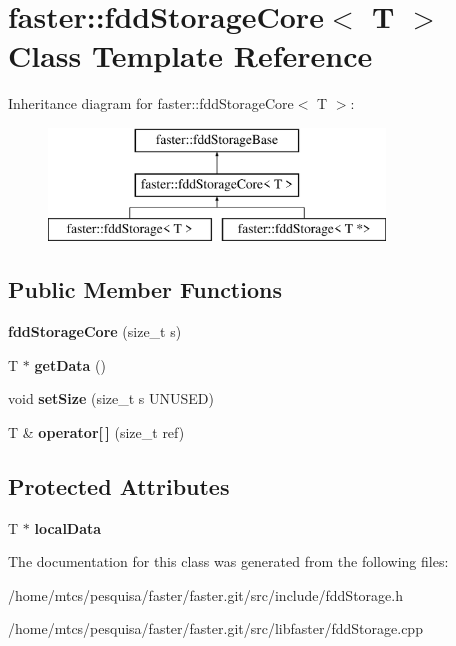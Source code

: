 \hypertarget{classfaster_1_1fddStorageCore}{}\section{faster\+:\+:fdd\+Storage\+Core$<$ T $>$ Class Template Reference}
\label{classfaster_1_1fddStorageCore}
Inheritance diagram for faster\+:\+:fdd\+Storage\+Core$<$ T $>$\+:\begin{figure}[H]
\begin{center}
\leavevmode
\includegraphics[height=3.000000cm]{classfaster_1_1fddStorageCore}
\end{center}
\end{figure}
\subsection*{Public Member Functions}
\begin{DoxyCompactItemize}
\item 
\hypertarget{classfaster_1_1fddStorageCore_aaae0b252366d73dec3995251fdc75920}{}\label{classfaster_1_1fddStorageCore_aaae0b252366d73dec3995251fdc75920} 
{\bfseries fdd\+Storage\+Core} (size\+\_\+t s)
\item 
\hypertarget{classfaster_1_1fddStorageCore_aa3d19bc27af39d838226ab3e196beb15}{}\label{classfaster_1_1fddStorageCore_aa3d19bc27af39d838226ab3e196beb15} 
T $\ast$ {\bfseries get\+Data} ()
\item 
\hypertarget{classfaster_1_1fddStorageCore_a6bf9e9e16bdcaf4164ac5a3d28848ec0}{}\label{classfaster_1_1fddStorageCore_a6bf9e9e16bdcaf4164ac5a3d28848ec0} 
void {\bfseries set\+Size} (size\+\_\+t s U\+N\+U\+S\+ED)
\item 
\hypertarget{classfaster_1_1fddStorageCore_ad4608901a31ab093edc8be2a3852a014}{}\label{classfaster_1_1fddStorageCore_ad4608901a31ab093edc8be2a3852a014} 
T \& {\bfseries operator\mbox{[}$\,$\mbox{]}} (size\+\_\+t ref)
\end{DoxyCompactItemize}
\subsection*{Protected Attributes}
\begin{DoxyCompactItemize}
\item 
\hypertarget{classfaster_1_1fddStorageCore_af2b22b0cda86b521472708991c38b797}{}\label{classfaster_1_1fddStorageCore_af2b22b0cda86b521472708991c38b797} 
T $\ast$ {\bfseries local\+Data}
\end{DoxyCompactItemize}


The documentation for this class was generated from the following files\+:\begin{DoxyCompactItemize}
\item 
/home/mtcs/pesquisa/faster/faster.\+git/src/include/fdd\+Storage.\+h\item 
/home/mtcs/pesquisa/faster/faster.\+git/src/libfaster/fdd\+Storage.\+cpp\end{DoxyCompactItemize}
